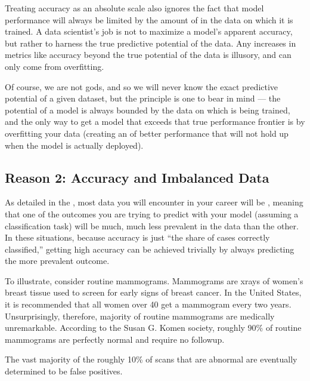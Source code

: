 \documentclass[letterpaper,10pt,english]{jupyterBook}
\begin{document}
\sphinxAtStartPar
Treating accuracy as an absolute scale also ignores the fact that model performance will always be limited by the amount of  in the data on which it is trained. A data scientist’s job is not to maximize a model’s apparent accuracy, but rather to harness the true predictive potential of the data. Any increases in metrics like accuracy beyond the true potential of the data is illusory, and can only come from overfitting.

\sphinxAtStartPar
Of course, we are not gods, and so we will never know the exact predictive potential of a given dataset, but the principle is one to bear in mind — the potential of a model is always bounded by the data on which is being trained, and the only way to get a model that exceeds that true performance frontier is by overfitting your data (creating an  of better performance that will not hold up when the model is actually deployed).


\subsection{Reason 2: Accuracy and Imbalanced Data}
\label{\detokenize{30_questions/24_passive_internal_errors:reason-2-accuracy-and-imbalanced-data}}
\sphinxAtStartPar
As detailed in the {\hyperref[\detokenize{10_introduction/23_mistakes::doc}]{}}, most data you will encounter in your career will be , meaning that one of the outcomes you are trying to predict with your model (assuming a classification task) will be much, much less prevalent in the data than the other. In these situations, because accuracy is just “the share of cases correctly classified,” getting high accuracy can be achieved trivially by always predicting the more prevalent outcome.

\sphinxAtStartPar
To illustrate, consider routine mammograms. Mammograms are x\sphinxhyphen{}rays of women’s breast tissue used to screen for early signs of breast cancer. In the United States, it is recommended that all women over 40 get a mammogram every two years. Unsurprisingly, therefore,  majority of routine mammograms are medically unremarkable. According to the Susan G. Komen society, roughly 90\% of routine mammograms are perfectly normal and require no followup.%
\begin{footnote}[2]\sphinxAtStartFootnote
The vast majority of the roughly 10\% of scans that are abnormal are eventually determined to be false positives.
%
\end{footnote}
\end{document}
